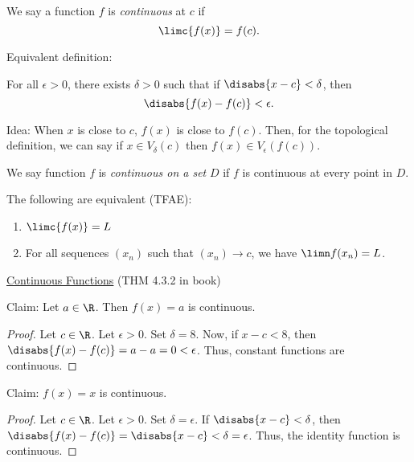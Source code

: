 \begin{definition}
    We say a function \(f\) is \textit{continuous} at \(c\) if
    \[
        \limc{f(x)} = f(c).
    \]

    Equivalent definition:

    For all \(\epsilon > 0\), there exists \(\delta > 0\) such that if \(\disabs{x - c} < \delta\), then
    \[
        \disabs{f(x) - f(c)} < \epsilon.
    \]
\end{definition}

Idea: When \(x\) is close to \(c\), \(f(x)\) is close to \(f(c)\). Then, for the topological definition, we can say if \(x \in V_\delta(c)\) then \(f(x) \in V_\epsilon(f(c))\).

\begin{definition}
    We say function \(f\) is \textit{continuous on a set} \(D\) if \(f\) is continuous at every point in \(D\).
\end{definition}

The following are equivalent (TFAE):

\begin{enumerate}
    \item \(\limc{f(x)} = L\)
    \item For all sequences \((x_n)\) such that \((x_n) \rightarrow c\), we have \(\limn f(x_n) = L\).
\end{enumerate}

\begin{center}
    \underline{Continuous Functions} (THM 4.3.2 in book)
\end{center}

Claim: Let \(a \in \R\). Then \(f(x) = a\) is continuous.

\begin{customframedproof}[linecolor=xgray]
    \begin{proof}
        Let \(c \in \R\). Let \(\epsilon > 0\). Set \(\delta = 8\). Now, if \(x - c < 8\), then \(\disabs{f(x) - f(c)} = a - a = 0 < \epsilon\). Thus, constant functions are continuous.
    \end{proof}
\end{customframedproof}

Claim: \(f(x) = x\) is continuous.

\begin{customframedproof}[linecolor=xgray]
    \begin{proof}
        Let \(c \in \R\). Let \(\epsilon > 0\). Set \(\delta = \epsilon\). If \(\disabs{x - c} < \delta\), then \(\disabs{f(x) - f(c)} = \disabs{x - c} < \delta = \epsilon\). Thus, the identity function is continuous.
    \end{proof}
\end{customframedproof}

